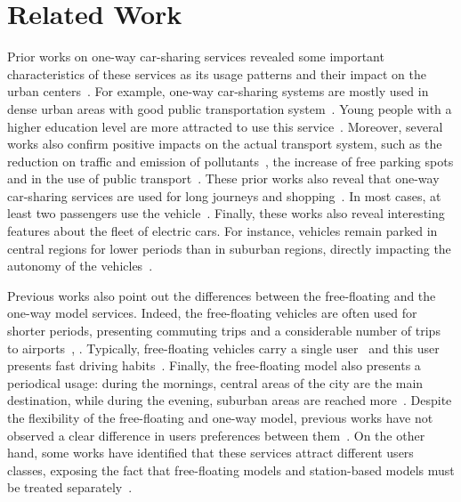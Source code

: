\section{Related Work} 
\label{sec:3_5_related}

Prior works on one-way car-sharing services revealed some important characteristics of these services as its usage patterns and their impact on the urban centers~\cite{becker2017comparing, ciari2014modeling, martin2011impact, boldrini:16}. For example, one-way car-sharing systems are mostly used in dense urban areas with good public transportation system~\cite{stillwater2009carsharing}. Young people with a higher education level are more attracted to use this service~\cite{burkhardt2006attracted}.  Moreover, several works also confirm positive impacts on the actual transport system, such as the reduction on traffic and emission of pollutants~\cite{cervero2004city,martin2011impact}, the increase of free parking spots and in the use of public transport~\cite{shaheen2010carsharing}.
These prior works also reveal that one-way car-sharing services are used for long journeys and shopping~\cite{ciari2014modeling}. In most cases, at least two passengers use the vehicle~\cite{becker2017comparing}. Finally, these works also reveal interesting features about the fleet of electric cars. For instance, vehicles remain parked in central regions for lower periods than in suburban regions, directly impacting the autonomy of the vehicles~\cite{boldrini:16}.

Previous works also point out the differences between the free-floating and the one-way model services. Indeed, the free-floating vehicles are often used for shorter periods, presenting commuting trips and a considerable number of trips to airports~\cite{ciari2014modeling}, \cite{becker2017comparing} \cite{coccacar}. Typically, free-floating vehicles carry a single user~\cite{becker2017comparing} and this user presents fast driving habits~\cite{ciociolaumap}. Finally, the free-floating model also presents a periodical usage: during the mornings, central areas of the city are the main destination, while during the evening, suburban areas are reached more~\cite{ciociolaumap}. 
Despite the flexibility of the free-floating and one-way model, previous works have not observed a clear difference in users preferences between them~\cite{ciari2014modeling}. On the other hand, some works have identified that these services attract different users classes, exposing the fact that free-floating models and station-based models must be treated separately~\cite{becker2017comparing}.

